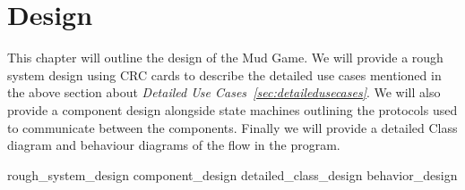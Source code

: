 \chapter{Design}

This chapter will outline the design of the Mud Game. We will provide a rough system design using CRC cards to describe the detailed use cases mentioned in the above section about \emph{Detailed Use Cases~\ref{sec:detailedusecases}}. We will also provide a component design alongside state machines outlining the protocols used to communicate between the components. Finally we will provide a detailed Class diagram and behaviour diagrams of the flow in the program. 

{rough_system_design}
{component_design}
{detailed_class_design}
{behavior_design}